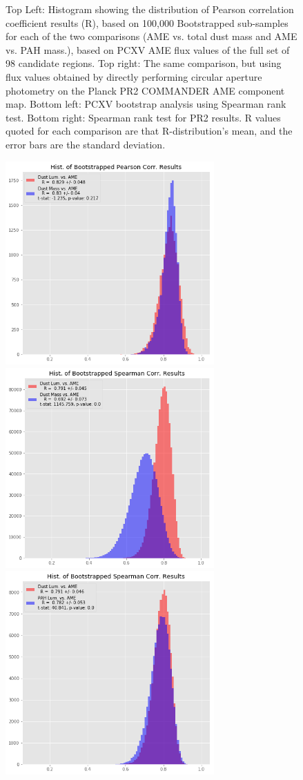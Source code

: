 \documentclass[preprint2,longabstract]{aastex}
\begin{document}
\begin{figure}
\centering
\caption{Top Left: Histogram showing the distribution of Pearson correlation coefficient results (R), based on 100,000 Bootstrapped sub-samples for each of the two comparisons (AME vs. total dust mass and AME vs. PAH mass.), based on PCXV AME flux values of the full set of 98 candidate regions. Top right:  The same comparison, but using flux values obtained by directly performing circular aperture photometry on the Planck PR2 COMMANDER AME component map. Bottom left: PCXV bootstrap analysis using Spearman rank test. Bottom right: Spearman rank test for PR2 results. R values quoted for each comparison are that R-distribution's mean, and the error bars are the standard deviation. }
\end{figure}

\begin{figure}
\label{fig:AME_boostrap_lum_regs_pr2}
\includegraphics[width=80mm]{Plots/AMEregs_bootstrap_DmassDlum_PCXV.png}
\includegraphics[width=80mm]{Plots/AMEregs_bootstrap_DmassDlum_spearman_PCXV.png}
\includegraphics[width=80mm]{Plots/AMEregs_bootstrap_PmassDlum_spearman_PR2.png}

\end{figure}
\end{document}
